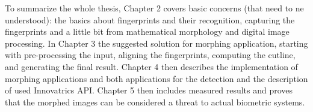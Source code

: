 To summarize the whole thesis, Chapter 2 covers basic concerns (that need to ne understood): the basics about fingerprints and their recognition, capturing the fingerprints and a little bit from mathematical morphology and digital image processing. In Chapter 3 the suggested solution for morphing application, starting with pre-processing the input, aligning the fingerprints, computing the cutline, and generating the final result. Chapter 4 then describes the implementation of morphing applications and both applications for the detection and the description of used Innovatrics API. Chapter 5 then includes measured results and proves that the morphed images can be considered a threat to actual biometric systems.